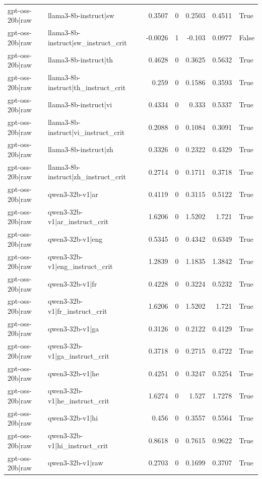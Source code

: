 \begin{table}
\begin{tabular}{l l r r r r l}
gpt-oss-20b|raw & llama3-8b-instruct|sw & 0.3507 & 0 & 0.2503 & 0.4511 & True \\
gpt-oss-20b|raw & llama3-8b-instruct|sw_instruct_crit & -0.0026 & 1 & -0.103 & 0.0977 & False \\
gpt-oss-20b|raw & llama3-8b-instruct|th & 0.4628 & 0 & 0.3625 & 0.5632 & True \\
gpt-oss-20b|raw & llama3-8b-instruct|th_instruct_crit & 0.259 & 0 & 0.1586 & 0.3593 & True \\
gpt-oss-20b|raw & llama3-8b-instruct|vi & 0.4334 & 0 & 0.333 & 0.5337 & True \\
gpt-oss-20b|raw & llama3-8b-instruct|vi_instruct_crit & 0.2088 & 0 & 0.1084 & 0.3091 & True \\
gpt-oss-20b|raw & llama3-8b-instruct|zh & 0.3326 & 0 & 0.2322 & 0.4329 & True \\
gpt-oss-20b|raw & llama3-8b-instruct|zh_instruct_crit & 0.2714 & 0 & 0.1711 & 0.3718 & True \\
gpt-oss-20b|raw & qwen3-32b-v1|ar & 0.4119 & 0 & 0.3115 & 0.5122 & True \\
gpt-oss-20b|raw & qwen3-32b-v1|ar_instruct_crit & 1.6206 & 0 & 1.5202 & 1.721 & True \\
gpt-oss-20b|raw & qwen3-32b-v1|eng & 0.5345 & 0 & 0.4342 & 0.6349 & True \\
gpt-oss-20b|raw & qwen3-32b-v1|eng_instruct_crit & 1.2839 & 0 & 1.1835 & 1.3842 & True \\
gpt-oss-20b|raw & qwen3-32b-v1|fr & 0.4228 & 0 & 0.3224 & 0.5232 & True \\
gpt-oss-20b|raw & qwen3-32b-v1|fr_instruct_crit & 1.6206 & 0 & 1.5202 & 1.721 & True \\
gpt-oss-20b|raw & qwen3-32b-v1|ga & 0.3126 & 0 & 0.2122 & 0.4129 & True \\
gpt-oss-20b|raw & qwen3-32b-v1|ga_instruct_crit & 0.3718 & 0 & 0.2715 & 0.4722 & True \\
gpt-oss-20b|raw & qwen3-32b-v1|he & 0.4251 & 0 & 0.3247 & 0.5254 & True \\
gpt-oss-20b|raw & qwen3-32b-v1|he_instruct_crit & 1.6274 & 0 & 1.527 & 1.7278 & True \\
gpt-oss-20b|raw & qwen3-32b-v1|hi & 0.456 & 0 & 0.3557 & 0.5564 & True \\
gpt-oss-20b|raw & qwen3-32b-v1|hi_instruct_crit & 0.8618 & 0 & 0.7615 & 0.9622 & True \\
gpt-oss-20b|raw & qwen3-32b-v1|raw & 0.2703 & 0 & 0.1699 & 0.3707 & True \\

\end{tabular}
\end{table}
